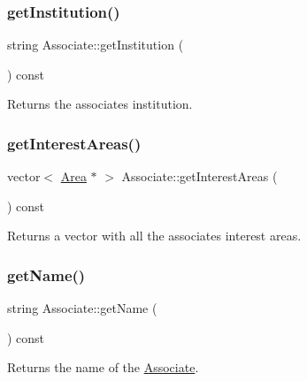 \subsubsection{\texorpdfstring{get\+Institution()}{getInstitution()}}
{\footnotesize\ttfamily string Associate\+::get\+Institution (\begin{DoxyParamCaption}{ }\end{DoxyParamCaption}) const}



Returns the associate\textquotesingle{}s institution. 

\mbox{\label{classAssociate_ac53645c77c48f2439dc3a5f8eb9ef530}} 
\subsubsection{\texorpdfstring{get\+Interest\+Areas()}{getInterestAreas()}}
{\footnotesize\ttfamily vector$<$ \mbox{\hyperlink{classArea}{Area}} $\ast$ $>$ Associate\+::get\+Interest\+Areas (\begin{DoxyParamCaption}{ }\end{DoxyParamCaption}) const}



Returns a vector with all the associate\textquotesingle{}s interest areas. 

\mbox{\label{classAssociate_a85601dd07022fc20f76f9f761fdcec6a}} 
\subsubsection{\texorpdfstring{get\+Name()}{getName()}}
{\footnotesize\ttfamily string Associate\+::get\+Name (\begin{DoxyParamCaption}{ }\end{DoxyParamCaption}) const}



Returns the name of the \mbox{\hyperlink{classAssociate}{Associate}}. 

\mbox{\label{classAssociate_ab3837d6afb9cba8e9f3213ca9b8368b9}} 
